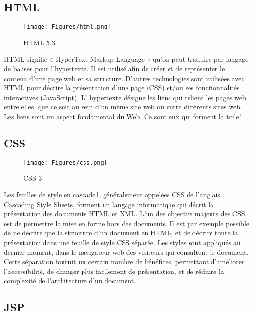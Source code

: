 \vspace{.5cm}
\subsection{HTML}
\vspace{.5cm}

\begin{figure}[H]
    \centering
    \texttt{[image: Figures/html.png]}
    \caption{HTML 5.3}
\end{figure}


HTML signifie « HyperText Markup Language » qu'on peut traduire par langage de balises pour l'hypertexte. Il est utilisé afin de créer et de représenter le contenu d'une page web et sa structure. D'autres technologies sont utilisées avec HTML pour décrire la présentation d'une page (CSS) et/ou ses fonctionnalités interactives (JavaScript). L' hypertexte désigne les liens qui relient les pages web entre elles, que ce soit au sein d'un même site web ou entre différents sites web. Les liens sont un aspect fondamental du Web. Ce sont eux qui forment la toile!

\vspace{.5cm}
\subsection{CSS}
\vspace{.5cm}

\begin{figure}[H]
    \centering
    \texttt{[image: Figures/css.png]}
    \caption{CSS-3}
\end{figure}

Les feuilles de style en cascade1, généralement appelées CSS de l'anglais Cascading Style Sheets, forment un langage informatique qui décrit la présentation des documents HTML et XML. L'un des objectifs majeurs des CSS est de permettre la mise en forme hors des documents. Il est par exemple possible de ne décrire que la structure d'un document en HTML, et de décrire toute la présentation dans une feuille de style CSS séparée. Les styles sont appliqués au dernier moment, dans le navigateur web des visiteurs qui consultent le document. Cette séparation fournit un certain nombre de bénéfices, permettant d'améliorer l'accessibilité, de changer plus facilement de présentation, et de réduire la complexité de l'architecture d'un document. 

\vspace{.5cm}
\subsection{JSP}
\vspace{.5cm}

